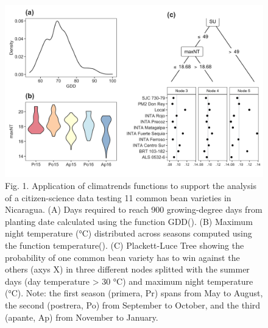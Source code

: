 \documentclass[
]{article}
\begin{document}
\begin{figure}
\includegraphics[width=0.8\linewidth]{cbean} \caption{Fig. 1. Application of climatrends functions to support the analysis of a citizen-science data testing 11 common bean varieties in Nicaragua. (A) Days required to reach 900 growing-degree days from planting date calculated using the function GDD(). (B) Maximum night temperature (°C) distributed across seasons computed using the function temperature(). (C) Plackett-Luce Tree showing the probability of one common bean variety has to win against the others (axys X) in three different nodes splitted with the summer days (day temperature > 30 °C) and maximum night temperature (°C). Note: the first season (primera, Pr) spans from May to August, the second (postrera, Po) from September to October, and the third (apante, Ap) from November to January.}\label{fig:fig_cbean}
\end{figure}
\end{document}
